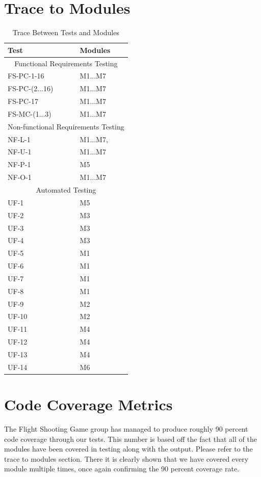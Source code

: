\documentclass[12,english]{article}
\begin{document}
		\FloatBarrier
	
	\newpage

\section{Trace to Modules}		%

\begin{table}[!htbp]
	\begin{tabular}{ll}
		\toprule
		Test & Modules \\
		\midrule
		\multicolumn{2}{c}{Functional Requirements Testing} \\
		\midrule
		FS-PC-1-16 & M1...M7 \\
		FS-PC-(2...16) & M1...M7 \\
		FS-PC-17 & M1...M7 \\
		FS-MC-(1...3) & M1...M7 \\
		\midrule
		\multicolumn{2}{c}{Non-functional Requirements Testing} \\
		\midrule
		NF-L-1 & M1...M7,\\
		NF-U-1 & M1...M7\\
		NF-P-1 & M5 \\	
		NF-O-1 & M1...M7\\
		\midrule
		\multicolumn{2}{c}{Automated Testing} \\
		\midrule
		UF-1 & M5\\
		UF-2 & M3\\
		UF-3 & M3\\
		UF-4 & M3\\
		UF-5 & M1\\
		UF-6 & M1\\
		UF-7 & M1\\
		UF-8 & M1\\
		UF-9 & M2\\
		UF-10 & M2\\
		UF-11 & M4\\
		UF-12 & M4\\
		UF-13 & M4\\
		UF-14 & M6\\
		\bottomrule
	\end{tabular}
	\caption{Trace Between Tests and Modules}
	\makeatletter
	\def\rulecolor#1#{\CT@arc{#1}}
	\def\CT@arc#1#2{%
		\ifdim\baselineskip=\z@\noalign\fi
		{\gdef\CT@arc@{\color#1{#2}}}}
	\let\CT@arc@\relax
	\makeatother
	\label{Table}
\end{table}

\FloatBarrier
	
	
\section{Code Coverage Metrics}				

	The Flight Shooting Game group has managed to produce roughly 90 percent code coverage through our tests. This number is based off the fact that all of the modules have been covered in testing along with the output. Please refer to the trace to modules section. There it is clearly shown that we have covered every module multiple times, once again confirming the 90 percent coverage rate.
\end{document}

